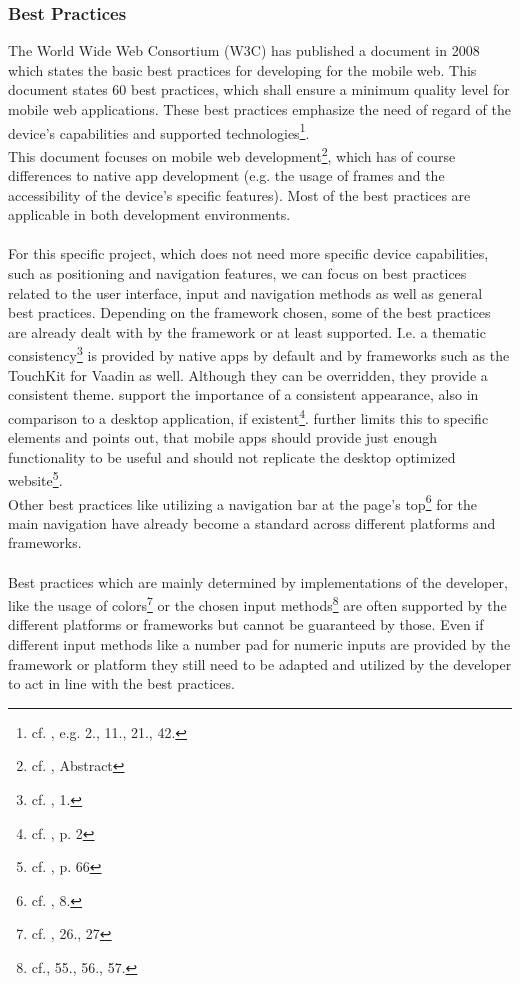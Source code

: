 \subsubsection{Best Practices}
\label{subsec:BestPractices}
The World Wide Web Consortium (W3C) has published a document in 2008 which states the basic best practices for developing for the mobile web. This document states 60 best practices, which shall ensure a minimum quality level for mobile web applications. These best practices emphasize the need of regard of the device's capabilities and supported technologies\footnote{cf. \cite{WorldWideWebConsortium.2008}, e.g. 2., 11., 21., 42.}. 
\\
This document focuses on mobile web development\footnote{cf. \cite{WorldWideWebConsortium.2008}, Abstract}, which has of course differences to native app development (e.g. the usage of frames and the accessibility of the device's specific features). Most of the best practices are applicable in both development environments.
\\
\\
For this specific project, which does not need more specific device capabilities, such as positioning and navigation features, we can focus on best practices related to the user interface, input and navigation methods as well as general best practices. Depending on the framework chosen, some of the best practices are already dealt with by the framework or at least supported. I.e. a thematic consistency\footnote{cf. \cite{WorldWideWebConsortium.2008}, 1.} is provided by native apps by default and by frameworks such as the TouchKit for Vaadin as well. Although they can be overridden, they provide a consistent theme. \cite{Wessels.2011} support the importance of a consistent appearance, also in comparison to a desktop application, if existent\footnote{cf. \cite{Wessels.2011}, p. 2}. \cite{Lica.2010} further limits this to specific elements and points out, that mobile apps should provide just enough functionality to be useful and should not replicate the desktop optimized website\footnote{cf. \cite{Lica.2010}, p. 66}.
\\
Other best practices like utilizing a navigation bar at the page's top\footnote{cf. \cite{WorldWideWebConsortium.2008}, 8.} for the main navigation have already become a standard across different platforms and frameworks.
\\
\\
Best practices which are mainly determined by implementations of the developer, like the usage of colors\footnote{cf. \cite{WorldWideWebConsortium.2008}, 26., 27} or the chosen input methods\footnote{cf.\cite{WorldWideWebConsortium.2008}, 55., 56., 57.} are often supported by the different platforms or frameworks but cannot be guaranteed by those. Even if different input methods like a number pad for numeric inputs are provided by the framework or platform they still need to be adapted and utilized by the developer to act in line with the best practices.

